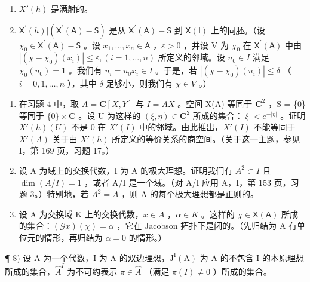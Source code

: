 \begin{enumerate}
\def\labelenumi{\alph{enumi})}
\item
  \(X'(h)\) 是满射的。
\item
  \(\mathsf{X}^{\prime}(h)|(\mathsf{X}^{\prime}(\mathsf{A})-\mathsf{S})\) 是从 \(\mathsf{X}^{\prime}(\mathsf{A})-\mathsf{S}\) 到 \(\mathsf{X}(\mathsf{I})\) 上的同胚。（设 \(\chi_{0}\in\mathsf{X}^{\prime}(\mathsf{A})-\mathsf{S}\) 。设 \(x_{1},\ldots,x_{n}\in\mathsf{A}\) ，\(\varepsilon>0\) ，并设 V 为 \(\chi_{0}\) 在 \(\mathsf{X}^{\prime}(\mathsf{A})\) 中由 \(|(\chi-\chi_{0})(x_{i})|\leqslant\varepsilon,(i=1,\ldots,n)\) 所定义的邻域。设 \(u_{0}\in I\) 满足 \(\chi_0(u_0) = 1\) 。我们有 \(u_i = u_0x_i \in I\) 。于是，若 \(|(\chi - \chi_0)(u_i)| \leqslant \delta\) （ \(i = 0, 1, \ldots, n\) ），其中 \(\delta\) 足够小，则我们有 \(\chi \in V\) 。）
\end{enumerate}

\begin{enumerate}
\def\labelenumi{\arabic{enumi})}
\setcounter{enumi}{4}
\item
  在习题 4 中，取 \(A = \mathbf{C}[X,Y]\) 与 \(I = AX\) 。空间 X(A) 等同于 \(\mathbf{C}^2\) ，S = \{0\} 等同于 \(\{0\} \times \mathbf{C}\) 。设 U 为这样的 \((\xi, \eta) \in \mathbf{C}^2\) 所成的集合：\(|\xi| < e^{-|\eta|}\) 。证明 \(X'(h)(U)\) 不是 0 在 \(X'(I)\) 中的邻域。由此推出，\(X'(I)\) 不能等同于 \(X'(A)\) 关于由 \(X'(h)\) 所定义的等价关系的商空间。（关于这一主题，参见 I，第 169 页，习题 17。）
\item
  设 A 为域上的交换代数，I 为 A 的极大理想。证明我们有 \(A^{2} \subset I\) 且 \(\dim(A/I) = 1\) ，或者 A/I 是一个域。（对 A/I 应用 A，I，第 153 页，习题 3。）特别地，若 \(A^{2} = A\) ，则 A 的每个极大理想都是正则的。
\item
  设 A 为交换域 K 上的交换代数，\(x \in A\) ，\(\alpha \in K\) 。这样的 \(\chi \in \mathsf{X}(\mathsf{A})\) 所成的集合：\((\mathcal{G}x)(\chi) = \alpha\) ，它在 Jacobson 拓扑下是闭的。（先归结为 A 有单位元的情形，再归结为 \(\alpha = 0\) 的情形。）
\end{enumerate}

¶ 8) 设 A 为一个代数，I 为 A 的双边理想，\(\mathrm{J}^{\mathrm{I}}(\mathrm{A})\) 为 A 的不包含 I 的本原理想所成的集合，\(\widehat{A}^{I}\) 为不可约表示 \(\pi \in \widehat{A}\) （满足 \(\pi(I) \neq 0\) ）所成的集合。

